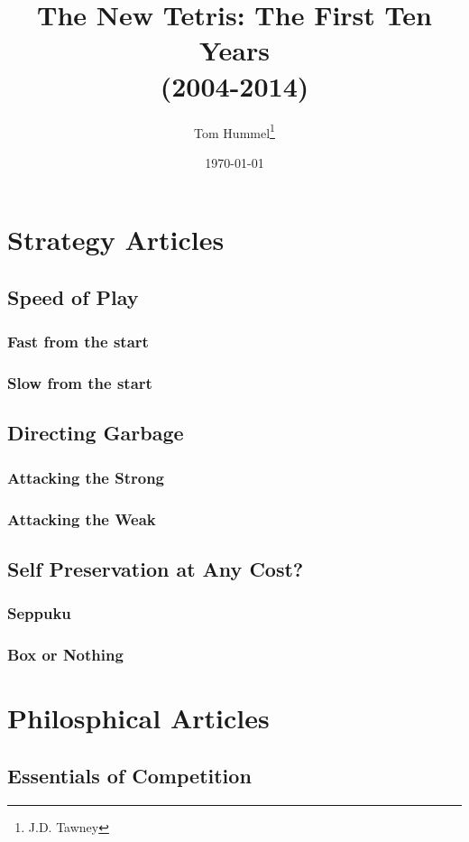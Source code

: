 \documentclass[a4paper,twoside,titlepage]{book}
\title{The New Tetris: The First Ten Years 
\\(2004-2014)}
\author{Tom Hummel\thanks{J.D. Tawney}}
\date{\today}
\begin{document}
  \maketitle
  \tableofcontents \newpage
  
  
  
  
  \part{Strategy Articles}
    \chapter{Speed of Play}
      \section{Fast from the start}
      \section{Slow from the start}
    \chapter{Directing Garbage}
      \section{Attacking the Strong}
      \section{Attacking the Weak}
    \chapter{Self Preservation at Any Cost?}
      \section{Seppuku}
      \section{Box or Nothing}
  \part{Philosphical Articles}
    \chapter{Essentials of Competition}
\end{document}
